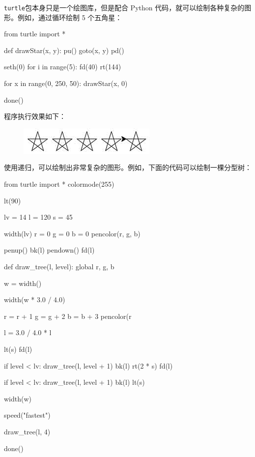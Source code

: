 \texttt{turtle}包本身只是一个绘图库，但是配合 Python
代码，就可以绘制各种复杂的图形。例如，通过循环绘制 5 个五角星：

\begin{pythoncode}
from turtle import *

def drawStar(x, y):
    pu()
    goto(x, y)
    pd()
    
    seth(0)
    for i in range(5):
        fd(40)
        rt(144)

for x in range(0, 250, 50):
    drawStar(x, 0)

done()
\end{pythoncode}

程序执行效果如下：

 
 \begin{figure}[htp]
	\centering
	\includegraphics[width=0.6\linewidth]{fig/1249600178485568l.png}
\end{figure}


使用递归，可以绘制出非常复杂的图形。例如，下面的代码可以绘制一棵分型树：

\begin{pythoncode}
from turtle import *
colormode(255)

lt(90)

lv = 14
l = 120
s = 45

width(lv)
r = 0
g = 0
b = 0
pencolor(r, g, b)

penup()
bk(l)
pendown()
fd(l)

def draw_tree(l, level):
    global r, g, b
    
    w = width()

    
    width(w * 3.0 / 4.0)
    
    r = r + 1
    g = g + 2
    b = b + 3
    pencolor(r %

    l = 3.0 / 4.0 * l

    lt(s)
    fd(l)

    if level < lv:
        draw_tree(l, level + 1)
    bk(l)
    rt(2 * s)
    fd(l)

    if level < lv:
        draw_tree(l, level + 1)
    bk(l)
    lt(s)

    
    width(w)

speed("fastest")

draw_tree(l, 4)

done()
\end{pythoncode}

